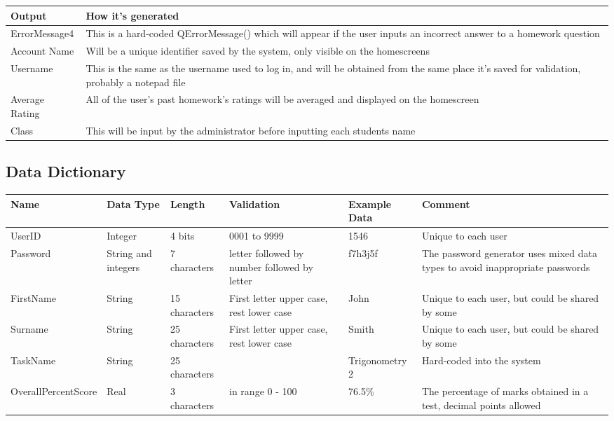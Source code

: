 \begin{center}
\begin{tabular}{|p{4cm}|p{6cm}|}  \hline
\textbf{Output} & \textbf{How it's generated} \\ \hline
ErrorMessage4 & This is a hard-coded QErrorMessage() which will appear if the user inputs an incorrect answer to a  homework question \\ \hline
Account Name & Will be a unique identifier saved by the system, only visible on the homescreens \\ \hline
Username & This is the same as the username used to log in, and will be obtained from the same place it's saved for validation, probably a notepad file \\ \hline
Average Rating & All of the user's past homework's ratings will be averaged and displayed on the homescreen \\ \hline
Class & This will be input by the administrator before inputting each students name \\ \hline
\end{tabular}
\end{center}

\subsection{Data Dictionary}

\begin{center}
\begin{tabular}{|p{3.4cm}|p{1.2cm}|p{2cm}|p{2cm}|p{2cm}|p{3.5cm}|}
\hline
\textbf{Name} & \textbf{Data Type} & \textbf{Length} & \textbf{Validation} & \textbf{Example Data} & \textbf{Comment} \\ \hline
UserID & Integer & 4 bits & 0001 to 9999 & 1546 & Unique to each user \\ \hline
Password & String and integers & 7 characters & letter followed by number followed by letter & f7h3j5f & The password generator uses mixed data types to avoid inappropriate passwords \\ \hline
FirstName & String & 15 characters & First letter upper case, rest lower case & John & Unique to each user, but could be shared by some \\ \hline
Surname & String & 25 characters & First letter upper case, rest lower case & Smith & Unique to each user, but could be shared by some \\ \hline
TaskName & String & 25 characters & & Trigonometry 2 & Hard-coded into the system \\ \hline
OverallPercentScore & Real & 3 characters & in range 0 - 100 & 76.5\% & The percentage of marks obtained in a test, decimal points allowed \\ \hline
\end{tabular}
\end{center}

